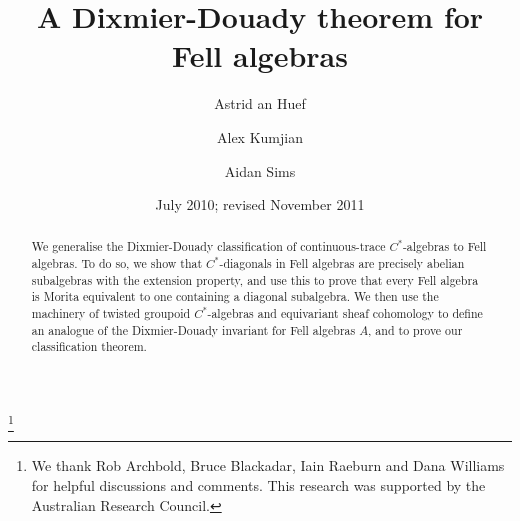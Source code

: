 \documentclass[12pt,a4paper]{amsart}
\begin{document}
 \usepackage{./extract}
\newtheorem{thm}{Theorem}[section]
\newtheorem{cor}[thm]{Corollary}
\newtheorem{posscor}[thm]{Possible Corollary}
\newtheorem{lemma}[thm]{Lemma}
\newtheorem{prop}[thm]{Proposition}
\newtheorem{goal}[thm]{Goal}
\newtheorem{conj}[thm]{Conjecture}
\newtheorem{notetoselves}[thm]{Note to selves}
\newtheorem{thm1}{Theorem}
\theoremstyle{definition}
\newtheorem{defn}[thm]{Definition}
\newtheorem{remark}[thm]{Remark}
\newtheorem{example}[thm]{Example}
\newtheorem{remarks}[thm]{Remarks}
\newtheorem{claim}[thm]{Claim}
\newtheorem{fact}[thm]{Fact}
\newtheorem{wish}[thm]{Wish}
\newtheorem{notation+h}[thm]{Notation}
\def\range{\operatorname{range}}


\title[A Dixmier-Douady theorem for Fell algebras]
{A Dixmier-Douady theorem for Fell algebras}

\author[an Huef]{Astrid an Huef}
\address{Department of Mathematics and Statistics\\
University of Otago\\
Dunedin 9054\\
New Zealand} 

\author[Kumjian]{Alex Kumjian}
\address{Department of Mathematics\\
University of Nevada \\
Reno, NV 89557\\
USA} 

\author[Sims]{Aidan Sims}
\address{School of Mathematics and Applied Statistics\\
University of Wollongong \\
NSW 2522\\
Australia} 



\thanks{We thank Rob Archbold, Bruce Blackadar, Iain Raeburn and Dana Williams
for helpful discussions and comments. This research was supported by the Australian Research
Council.}


\date{July 2010; revised November 2011}

\begin{abstract}
We generalise the Dixmier-Douady classification of
continuous-trace $C^*$-algebras to Fell algebras. To do so, we
show that $C^*$-diagonals in Fell algebras are precisely
abelian subalgebras with the extension property, and use this
to prove that every Fell algebra is Morita equivalent to one
containing a diagonal subalgebra. We then use the machinery of
twisted groupoid $C^*$-algebras and equivariant sheaf
cohomology to define an analogue of the Dixmier-Douady
invariant for Fell algebras $A$, and to prove our
classification theorem.
\end{abstract}
\end{document}
